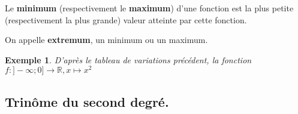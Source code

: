 \documentclass{beamer}
\newtheorem{exemple}{Exemple}
\begin{document}
  
  \begin{frame} %
    \begin{definition}
      
    Le \textbf{minimum} (respectivement le \textbf{maximum}) d’une fonction est la plus 
    petite (respectivement la plus grande) valeur atteinte par cette fonction.
    
    On appelle \textbf{extremum}, un minimum ou un maximum.
    \end{definition}
    
    {
    \begin{exemple}
    D'après le tableau de variations précédent, 
    la fonction $f:]-\infty ; 0] \to \mathbb{R}, x \mapsto x^2$ 
    \end{exemple}
    }
  \end{frame}
  
  \subsection{Trinôme du second degré.}
  
\end{document}
